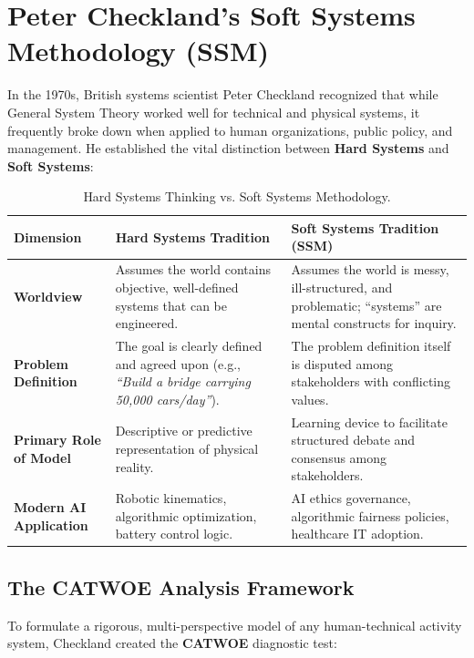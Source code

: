 \section{Peter Checkland's Soft Systems Methodology (SSM)}
\label{sec:checkland_ssm}

In the 1970s, British systems scientist Peter Checkland recognized that while General System Theory worked well for technical and physical systems, it frequently broke down when applied to human organizations, public policy, and management. He established the vital distinction between \textbf{Hard Systems} and \textbf{Soft Systems}:

\begin{table}[htbp]
\centering
\small
\renewcommand{\arraystretch}{1.3}
\begin{tabularx}{\textwidth}{p{3.2cm}p{5.8cm}X}
\toprule
\textbf{Dimension} & \textbf{Hard Systems Tradition} & \textbf{Soft Systems Tradition (SSM)} \\
\midrule
\textbf{Worldview} & Assumes the world contains objective, well-defined systems that can be engineered. & Assumes the world is messy, ill-structured, and problematic; ``systems'' are mental constructs for inquiry. \\
\textbf{Problem Definition} & The goal is clearly defined and agreed upon (e.g., \textit{``Build a bridge carrying 50,000 cars/day''}). & The problem definition itself is disputed among stakeholders with conflicting values. \\
\textbf{Primary Role of Model} & Descriptive or predictive representation of physical reality. & Learning device to facilitate structured debate and consensus among stakeholders. \\
\textbf{Modern AI Application} & Robotic kinematics, algorithmic optimization, battery control logic. & AI ethics governance, algorithmic fairness policies, healthcare IT adoption. \\
\bottomrule
\end{tabularx}
\caption{Hard Systems Thinking vs. Soft Systems Methodology.}
\label{tab:hard_vs_soft}
\end{table}

\subsection{The CATWOE Analysis Framework}
To formulate a rigorous, multi-perspective model of any human-technical activity system, Checkland created the \textbf{CATWOE} diagnostic test:

